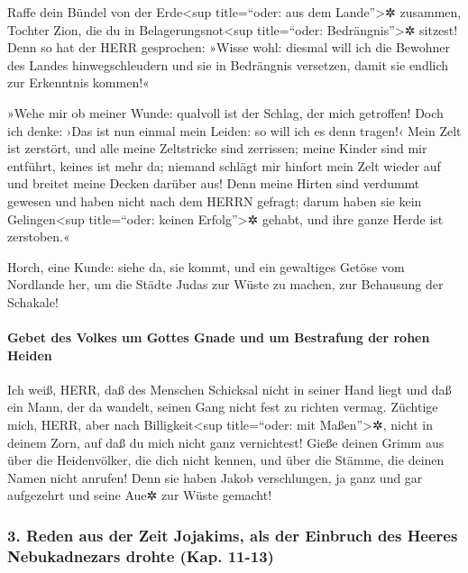 Raffe dein Bündel von der Erde\textless sup title=``oder:
aus dem Lande''\textgreater✲ zusammen, Tochter Zion, die du in
Belagerungsnot\textless sup title=``oder: Bedrängnis''\textgreater✲
sitzest! Denn so hat der HERR gesprochen: »Wisse wohl:
diesmal will ich die Bewohner des Landes hinwegschleudern und sie in
Bedrängnis versetzen, damit sie endlich zur Erkenntnis kommen!«

»Wehe mir ob meiner Wunde: qualvoll ist der Schlag, der
mich getroffen! Doch ich denke: ›Das ist nun einmal mein Leiden: so will
ich es denn tragen!‹ Mein Zelt ist zerstört, und alle
meine Zeltstricke sind zerrissen; meine Kinder sind mir entführt, keines
ist mehr da; niemand schlägt mir hinfort mein Zelt wieder auf und
breitet meine Decken darüber aus! Denn meine Hirten sind
verdummt gewesen und haben nicht nach dem HERRN gefragt; darum haben sie
kein Gelingen\textless sup title=``oder: keinen Erfolg''\textgreater✲
gehabt, und ihre ganze Herde ist zerstoben.«

Horch, eine Kunde: siehe da, sie kommt, und ein
gewaltiges Getöse vom Nordlande her, um die Städte Judas zur Wüste zu
machen, zur Behausung der Schakale!

\hypertarget{gebet-des-volkes-um-gottes-gnade-und-um-bestrafung-der-rohen-heiden}{%
\paragraph{Gebet des Volkes um Gottes Gnade und um Bestrafung der rohen
Heiden}\label{gebet-des-volkes-um-gottes-gnade-und-um-bestrafung-der-rohen-heiden}}

Ich weiß, HERR, daß des Menschen Schicksal nicht in
seiner Hand liegt und daß ein Mann, der da wandelt, seinen Gang nicht
fest zu richten vermag. Züchtige mich, HERR, aber nach
Billigkeit\textless sup title=``oder: mit Maßen''\textgreater✲, nicht in
deinem Zorn, auf daß du mich nicht ganz vernichtest!
Gieße deinen Grimm aus über die Heidenvölker, die dich
nicht kennen, und über die Stämme, die deinen Namen nicht anrufen! Denn
sie haben Jakob verschlungen, ja ganz und gar aufgezehrt und seine Aue✲
zur Wüste gemacht!

\hypertarget{reden-aus-der-zeit-jojakims-als-der-einbruch-des-heeres-nebukadnezars-drohte-kap.-11-13}{%
\subsubsection{3. Reden aus der Zeit Jojakims, als der Einbruch des
Heeres Nebukadnezars drohte (Kap.
11-13)}\label{reden-aus-der-zeit-jojakims-als-der-einbruch-des-heeres-nebukadnezars-drohte-kap.-11-13}}

